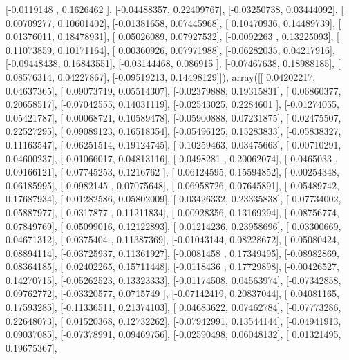 \documentclass{article}
\begin{document}
       [-0.0119148 ,  0.1626462 ],
       [-0.04488357,  0.22409767],
       [-0.03250738,  0.03444092],
       [ 0.00709277,  0.10601402],
       [-0.01381658,  0.07445968],
       [ 0.10470936,  0.14489739],
       [ 0.01376011,  0.18478931],
       [ 0.05026089,  0.07927532],
       [-0.0092263 ,  0.13225093],
       [ 0.11073859,  0.10171164],
       [ 0.00360926,  0.07971988],
       [-0.06282035,  0.04217916],
       [-0.09448438,  0.16843551],
       [-0.03144468,  0.086915  ],
       [-0.07467638,  0.18988185],
       [ 0.08576314,  0.04227867],
       [-0.09519213,  0.14498129]]), array([[ 0.04202217,  0.04637365],
       [ 0.09073719,  0.05514307],
       [-0.02379888,  0.19315831],
       [ 0.06860377,  0.20658517],
       [-0.07042555,  0.14031119],
       [-0.02543025,  0.2284601 ],
       [-0.01274055,  0.05421787],
       [ 0.00068721,  0.10589478],
       [-0.05900888,  0.07231875],
       [ 0.02475507,  0.22527295],
       [ 0.09089123,  0.16518354],
       [-0.05496125,  0.15283833],
       [-0.05838327,  0.11163547],
       [-0.06251514,  0.19124745],
       [ 0.10259463,  0.03475663],
       [-0.00710291,  0.04600237],
       [-0.01066017,  0.04813116],
       [-0.0498281 ,  0.20062074],
       [ 0.0465033 ,  0.09166121],
       [-0.07745253,  0.1216762 ],
       [ 0.06124595,  0.15594852],
       [-0.00254348,  0.06185995],
       [-0.0982145 ,  0.07075648],
       [ 0.06958726,  0.07645891],
       [-0.05489742,  0.17687934],
       [ 0.01282586,  0.05802009],
       [ 0.03426332,  0.23335838],
       [ 0.07734002,  0.05887977],
       [ 0.0317877 ,  0.11211834],
       [ 0.00928356,  0.13169294],
       [-0.08756774,  0.07849769],
       [ 0.05099016,  0.12122893],
       [ 0.01214236,  0.23958696],
       [ 0.03300669,  0.04671312],
       [ 0.0375404 ,  0.11387369],
       [-0.01043144,  0.08228672],
       [ 0.05080424,  0.08894114],
       [-0.03725937,  0.11361927],
       [-0.0081458 ,  0.17349495],
       [-0.08982869,  0.08364185],
       [ 0.02402265,  0.15711448],
       [-0.0118436 ,  0.17729898],
       [-0.00426527,  0.14270715],
       [-0.05262523,  0.13323333],
       [-0.01174508,  0.04563974],
       [-0.07342858,  0.09762772],
       [-0.03320577,  0.0715749 ],
       [-0.07142419,  0.20837044],
       [ 0.04081165,  0.17593285],
       [-0.11336511,  0.21374103],
       [ 0.04683622,  0.07462784],
       [-0.07773286,  0.22648073],
       [ 0.01520368,  0.12732262],
       [-0.07942991,  0.13544144],
       [-0.04941913,  0.09037085],
       [-0.07378991,  0.09469756],
       [-0.02590498,  0.06048132],
       [ 0.01321495,  0.19675367],
\end{document}
